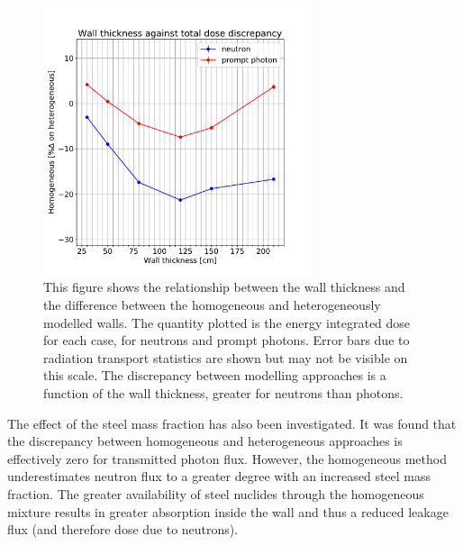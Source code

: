 \begin{figure}[H]
  \centering
  \includegraphics[width=0.7\textwidth]{wall_thickness}
  \caption{This figure shows the relationship between the wall thickness and the difference between the homogeneous and heterogeneously modelled walls. The quantity plotted is the energy integrated dose for each case, for neutrons and prompt photons. Error bars due to radiation transport statistics are shown but may not be visible on this scale. The discrepancy between modelling approaches is a function of the wall thickness, greater for neutrons than photons.}
  \label{fig:dose_discrepancy}
\end{figure}

The effect of the steel mass fraction has also been investigated. It was found that the discrepancy between homogeneous and heterogeneous approaches is effectively zero for transmitted photon flux. However, the homogeneous method underestimates neutron flux to a greater degree with an increased steel mass fraction. The greater availability of steel nuclides through the homogeneous mixture results in greater absorption inside the wall and thus a reduced leakage flux (and therefore dose due to neutrons).



